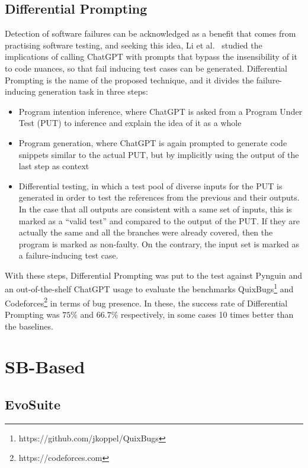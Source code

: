 \documentclass[%
  chapterprefix=false,%
  open=right,%
  twoside=true,%
  paper=a4,%
  logofile={Figures/logo.png},%
  thesistype=master,%
  UKenglish,%
]{se2thesis}
\begin{document}
\subsection{Differential Prompting}

Detection of software failures can be acknowledged as a benefit that comes from practising software testing, and seeking this idea, Li et al.~\cite{li2023nuances} studied the implications of calling ChatGPT with prompts that bypass the insensibility of it to code nuances, so that fail inducing test cases can be generated.
Differential Prompting is the name of the proposed technique, and it divides the failure-inducing generation task in three steps:

\begin{itemize}
  \item Program intention inference, where ChatGPT is asked from a Program Under Test (PUT) to inference and explain the idea of it as a whole
  \item Program generation, where ChatGPT is again prompted to generate code snippets similar to the actual PUT, but by implicitly using the output of the last step as context
  \item Differential testing, in which a test pool of diverse inputs for the PUT is generated in order to test the references from the previous and their outputs.
  In the case that all outputs are consistent with a same set of inputs, this is marked as a ``valid test'' and compared to the output of the PUT.\@
  If they are actually the same and all the branches were already covered, then the program is marked as non-faulty.
  On the contrary, the input set is marked as a failure-inducing test case.
\end{itemize}

With these steps, Differential Prompting was put to the test against Pynguin and an out-of-the-shelf ChatGPT usage to evaluate the benchmarks QuixBugs\footnote{https://github.com/jkoppel/QuixBugs} and Codeforces\footnote{https://codeforces.com} in terms of bug presence.
In these, the success rate of Differential Prompting was \(75\%\) and \(66.7\%\) respectively, in some cases 10 times better than the baselines.

\section{SB-Based}

\subsection{EvoSuite}
\end{document}
